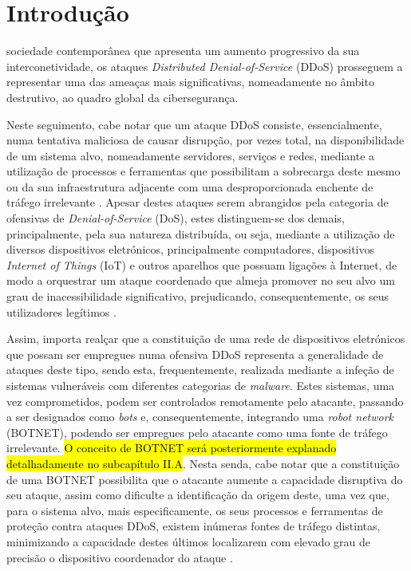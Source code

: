 \section{Introdução}
 sociedade contemporânea que apresenta um aumento progressivo da sua interconetividade, os ataques \textit{Distributed Denial-of-Service} (DDoS) prosseguem a representar uma das ameaças mais significativas, nomeadamente no âmbito destrutivo, ao quadro global da cibersegurança.

Neste seguimento, cabe notar que um ataque DDoS consiste, essencialmente, numa tentativa maliciosa
de causar disrupção, por vezes total, na disponibilidade de um sistema alvo, nomeadamente servidores, serviços e redes, mediante a utilização de processos e ferramentas que possibilitam a sobrecarga deste mesmo ou da sua infraestrutura adjacente com uma desproporcionada enchente de tráfego irrelevante \cite{cloudflare_what_is_ddos,ibm_what_is_ddos}. Apesar destes ataques serem abrangidos pela categoria de ofensivas de \textit{Denial-of-Service} (DoS), estes distinguem-se dos demais, principalmente, pela sua natureza distribuída, ou seja, mediante a utilização de diversos dispositivos eletrónicos, principalmente computadores, dispositivos \textit{Internet of Things} (IoT) e outros aparelhos que possuam ligações à Internet, de modo a orquestrar um ataque coordenado que almeja promover no seu alvo um grau de inacessibilidade significativo, prejudicando, consequentemente, os seus utilizadores legítimos \cite{zenamor_differences_dos_and_ddos}.

Assim, importa realçar que a constituição de uma rede de dispositivos eletrónicos que possam ser empregues numa ofensiva DDoS representa a generalidade de ataques deste tipo, sendo esta, frequentemente, realizada mediante a infeção de sistemas vulneráveis com diferentes categorias de \textit{malware}. Estes sistemas, uma vez comprometidos, podem ser controlados remotamente pelo atacante, passando a ser designados como \textit{bots} e, consequentemente, integrando uma \textit{robot network} (BOTNET), podendo ser empregues pelo atacante como uma fonte de tráfego irrelevante. \hl{O conceito de BOTNET será posteriormente explanado detalhadamente no subcapítulo II.A}. Nesta senda, cabe notar que a constituição de uma BOTNET possibilita que o atacante aumente a capacidade disruptiva do seu ataque, assim como dificulte a identificação da origem deste, uma vez que, para o sistema alvo, mais especificamente, os seus processos e ferramentas de proteção contra ataques DDoS, existem inúmeras fontes de tráfego distintas, minimizando a capacidade destes últimos localizarem com elevado grau de precisão o dispositivo coordenador do ataque \cite{cloudflare_what_is_ddos}.

